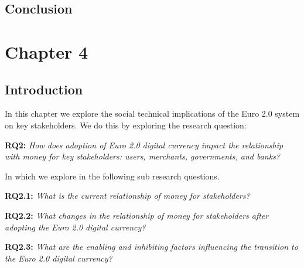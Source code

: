 \documentclass[12pt]{article} %
\begin{document}
{

\subsection{Conclusion} \label{ssec:3.7}


\pagebreak

\section{Chapter 4} \label{sec:4}

\subsection{Introduction} \label{ssec:4.1}

In this chapter we explore the social technical implications of the Euro 2.0 system on key stakeholders. We do this by exploring the research question:

\begin{quoting}
	\textbf{RQ2:} \textit{How does adoption of Euro 2.0 digital currency impact the relationship with money for key stakeholders: users, merchants, governments, and banks?}
\end{quoting}

In which we explore in the following sub research questions.

\begin{quoting}
	\textbf{RQ2.1:} \textit{What is the current relationship of money for stakeholders?}
\end{quoting}
\begin{quoting}
	\textbf{RQ2.2:} \textit{What changes in the relationship of money for stakeholders after adopting the Euro 2.0 digital currency?}
\end{quoting}
\begin{quoting}
	\textbf{RQ2.3:} \textit{What are the enabling and inhibiting factors influencing the transition to the Euro 2.0 digital currency?}
\end{quoting}

}
\end{document}
